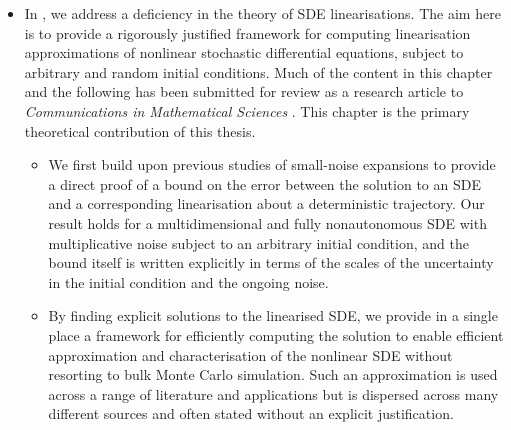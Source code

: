 \begin{itemize}
	\item In , we address a deficiency in the theory of SDE linearisations. %
	      The aim here is to provide a rigorously justified framework for computing linearisation approximations of nonlinear stochastic differential equations, subject to arbitrary and random initial conditions.
	      Much of the content in this chapter and the following  has been submitted for review as a research article to \emph{Communications in Mathematical Sciences} \citep{BlakeEtAl_2023_ConvergenceStochasticDifferential}.
	      This chapter is the primary theoretical contribution of this thesis.

	      \begin{itemize}
		      \item We first build upon previous studies of small-noise expansions \citep{Sanz-AlonsoStuart_2017_GaussianApproximationsSmall,Blagoveshchenskii_1962_DiffusionProcessesDepending,FreidlinWentzell_1998_RandomPerturbationsDynamical} to provide a direct proof of a bound on the error between the solution to an SDE and a corresponding linearisation about a deterministic trajectory.
		            Our result holds for a multidimensional and fully nonautonomous SDE with multiplicative noise subject to an arbitrary initial condition, and the bound itself is written explicitly in terms of the scales of the uncertainty in the initial condition and the ongoing noise.

		      \item By finding explicit solutions to the linearised SDE, we provide in a single place a framework for efficiently computing the solution to enable efficient approximation and characterisation of the nonlinear SDE without resorting to bulk Monte Carlo simulation.
		            Such an approximation is used across a range of literature and applications \citep{Jazwinski_2014_StochasticProcessesFiltering,SarkkaSolin_2019_AppliedStochasticDifferential,KaszasHaller_2020_UniversalUpperEstimate,ArchambeauEtAl_2007_GaussianProcessApproximations,Sanz-AlonsoStuart_2017_GaussianApproximationsSmall,LawEtAl_2015_DataAssimilationMathematical,ReichCotter_2015_ProbabilisticForecastingBayesian,BudhirajaEtAl_2019_AssimilatingDataModels} but is dispersed across many different sources and often stated without an explicit justification.


\end{itemize}
\end{itemize}
